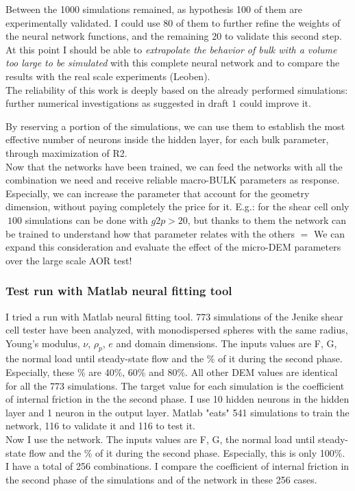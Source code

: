 Between the 1000 simulations remained, as hypothesis 100 of them are experimentally validated. I could use 80 of them to further refine the weights of the neural network functions, and the remaining 20 to validate this second step. At this point I should be able to \textit{extrapolate the behavior of bulk with a volume too large to be simulated} with this complete neural network and to compare the results with the real scale experiments (Leoben).\\

The reliability of this work is deeply based on the already performed simulations: further numerical investigations as suggested in draft $1$ could improve it.

By reserving a portion of the simulations, we can use them to establish the most effective number of neurons inside the hidden layer, for each bulk parameter, through maximization of R2.\\

Now that the networks have been trained, we can feed the networks with all the combination we need and receive reliable macro-BULK parameters as response.
Especially, we can increase the parameter that account for the geometry dimension, without paying completely the price for it.
E.g.: for the shear cell only $~100$ simulations can be done with $g2p >20$, but thanks to them the network can be trained to understand how that parameter relates with the others $=$ We can expand this consideration and evaluate the effect of the micro-DEM parameters over the large scale AOR test!


\subsubsection{Test run with Matlab neural fitting tool}
\label{subsubsection:testrunmatlab}

I tried a run with Matlab neural fitting tool.
773 simulations of the Jenike shear cell tester have been analyzed, with monodispersed spheres with the same radius, Young's modulus, $\nu$, $\rho_p$, $e$ and domain dimensions.
The inputs values are F, G, the normal load until steady-state flow and the \% of it during the second phase.
Especially, these \% are 40\%, 60\% and 80\%.
All other DEM values are identical for all the 773 simulations.
The target value for each simulation is the coefficient of internal friction in the the second phase.
I use 10 hidden neurons in the hidden layer and 1 neuron in the output layer.
Matlab "eats" 541 simulations to train the network, 116 to validate it and 116 to test it.\\
Now I use the network. 
The inputs values are F, G, the normal load until steady-state flow and the \% of it during the second phase.
Especially, this is only 100\%.
I have a total of 256 combinations.
I compare the coefficient of internal friction in the second phase of the simulations and of the network in these 256 cases.

